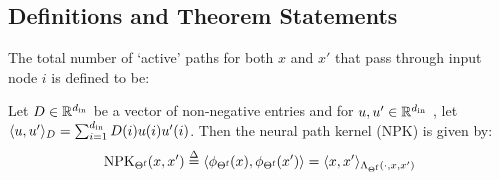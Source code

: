 

\subsection{Definitions and Theorem Statements}

\begin{definition}\label{def:overlap} 
The total number of `active' paths for both $x$ and $x'$ that pass through input node $i$ is defined to be:

{\par}
\end{definition}
%
\begin{lemma}\label{lm:npk}
Let $D\in\mathbb{R}^{d_{\text{in}}}$ be a vector of non-negative entries  and for $u,u'\in\mathbb{R}^{d_{\text{in}}}$ , let $\langle u,u'\rangle_{D}=\sum_{i=1}^{d_{\text{in}}}D(i)u(i)u'(i)$. Then the neural path kernel (NPK) is given by: 
\begin{align*} 
\text{NPK}_{\Theta^{\textrm{f}}}(x,x')\stackrel{\Delta}{=} \langle \phi_{\Theta^{\textrm{f}}}(x),\phi_{\Theta^{\textrm{f}}}(x')\rangle= \langle x,x'\rangle_{\Lambda_{\Theta^{\textrm{f}}}(\cdot,x,x')} 
\end{align*}
\end{lemma}




